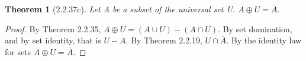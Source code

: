 \documentclass[a4paper, 12pt]{article}
\theoremstyle{plain}
\newtheorem*{theorem*}{Theorem}
\begin{document}
	
	\begin{theorem*}[2.2.37c]
		Let A be a subset of the universal set U. $A \oplus U = \overline{A}$.
	\end{theorem*}
	
	\begin{proof}
		By Theorem 2.2.35, $A \oplus U = (A \cup U) - (A \cap U)$. By set domination, and by set 
		identity, that is $U - A$. By Theorem 2.2.19, $U \cap \overline{A}$. By the identity law 
		for sets $A \oplus U = \overline{A}$.
	\end{proof}
\end{document}
